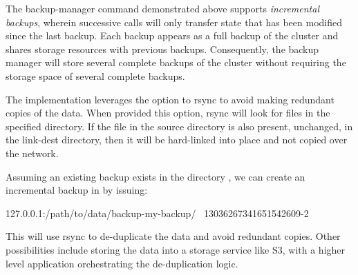 The backup-manager command demonstrated above supports {\em incremental
backups}, wherein successive calls will only transfer state that has been
modified since the last backup.  Each backup appears as a full backup of the
cluster and shares storage resources with previous backups.  Consequently, the
backup manager will store several complete backups of the cluster without
requiring the storage space of several complete backups.

The implementation leverages the  option to rsync to avoid
making redundant copies of the data.  When provided this option, rsync will look
for files in the specified directory.  If the file in the source directory is
also present, unchanged, in the link-dest directory, then it will be hard-linked
into place and not copied over the network.

Assuming an existing backup exists in the directory
, we can create an incremental backup in
 by issuing:

\begin{consolecode}
    127.0.0.1:/path/to/data/backup-my-backup/ \
    13036267341651542609-2
\end{consolecode}

This will use rsync to de-duplicate the data and avoid redundant copies.  Other
possibilities include storing the data into a storage service like S3, with a
higher level application orchestrating the de-duplication logic.
